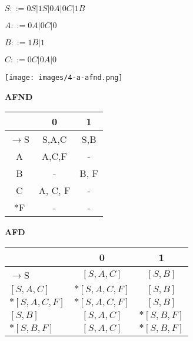 \documentclass[ ]{article}
\begin{document}
		$S::= 0S | 1S | 0A | 0C | 1B$
		
		$A::= 0A | 0C | 0$
		
		$B::= 1B | 1$
		
		$C::= 0C | 0A | 0$
		
		
		\texttt{[image: images/4-a-afnd.png]}
		
\begin{center}
    \begin{minipage}[t]{0.48\textwidth} %
        \centering %
        \textbf{AFND}\\ %
        \vspace{0.2cm} %
        \begin{tabular}{|c|c|c|} %
            \toprule %
            & 0 & 1 \\
            \midrule %
            $\to$S & S,A,C & S,B\\
            A & A,C,F & -\\
            B & - &  B, F\\
            C & A, C, F & -\\
            *F & - & - \\
            \bottomrule %
        \end{tabular}
    \end{minipage}%
    \hfill %
    \begin{minipage}[t]{0.48\textwidth} %
        \centering %
        \textbf{AFD}\\ %
        \vspace{0.2cm} %
        \begin{tabular}{|l|c|c|} %
            \toprule %
            & 0 & 1 \\
            \midrule %
            $\to$S & $[S,A,C]$ & $[S,B]$\\ %
            $[S,A,C]$ & $*[S,A,C,F]$ & $[S,B]$ \\
            $*[S,A,C,F]$ & $*[S,A,C,F]$ & $[S,B]$ \\
            $[S,B]$ & $[S,A,C]$ & $*[S,B,F]$\\
            $*[S,B,F]$ & $[S,A,C]$ & $*[S,B,F]$\\
            \bottomrule %
        \end{tabular}
    \end{minipage}
\end{center}
		
\end{document}

